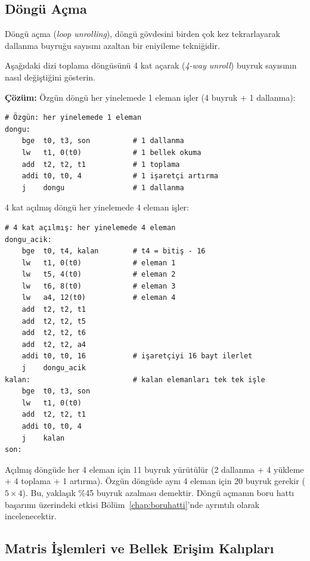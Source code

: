 \subsection{Döngü Açma}
\label{subsec:dongu-acma}

Döngü açma (\emph{loop unrolling}), döngü gövdesini birden çok kez tekrarlayarak dallanma buyruğu sayısını azaltan bir eniyileme tekniğidir.

\begin{ornek}[4.21]
\label{orn:dongu-acma}
Aşağıdaki dizi toplama döngüsünü 4 kat açarak (\emph{4-way unroll}) buyruk sayısının nasıl değiştiğini gösterin.

\textbf{Çözüm:} Özgün döngü her yinelemede 1 eleman işler (4 buyruk + 1 dallanma):

\begin{lstlisting}[style=riscv]
# Özgün: her yinelemede 1 eleman
dongu:
    bge  t0, t3, son          # 1 dallanma
    lw   t1, 0(t0)            # 1 bellek okuma
    add  t2, t2, t1           # 1 toplama
    addi t0, t0, 4            # 1 işaretçi artırma
    j    dongu                # 1 dallanma
\end{lstlisting}

4 kat açılmış döngü her yinelemede 4 eleman işler:

\begin{lstlisting}[style=riscv]
# 4 kat açılmış: her yinelemede 4 eleman
dongu_acik:
    bge  t0, t4, kalan        # t4 = bitiş - 16
    lw   t1, 0(t0)            # eleman 1
    lw   t5, 4(t0)            # eleman 2
    lw   t6, 8(t0)            # eleman 3
    lw   a4, 12(t0)           # eleman 4
    add  t2, t2, t1
    add  t2, t2, t5
    add  t2, t2, t6
    add  t2, t2, a4
    addi t0, t0, 16           # işaretçiyi 16 bayt ilerlet
    j    dongu_acik
kalan:                        # kalan elemanları tek tek işle
    bge  t0, t3, son
    lw   t1, 0(t0)
    add  t2, t2, t1
    addi t0, t0, 4
    j    kalan
son:
\end{lstlisting}

Açılmış döngüde her 4 eleman için 11 buyruk yürütülür (2 dallanma + 4 yükleme + 4 toplama + 1 artırma). Özgün döngüde aynı 4 eleman için 20 buyruk gerekir ($5 \times 4$). Bu, yaklaşık \%45 buyruk azalması demektir. Döngü açmanın boru hattı başarımı üzerindeki etkisi Bölüm~\ref{chap:boruhatti}'nde ayrıntılı olarak incelenecektir.
\end{ornek}


\subsection{Matris İşlemleri ve Bellek Erişim Kalıpları}
\label{subsec:matris-erişim}

